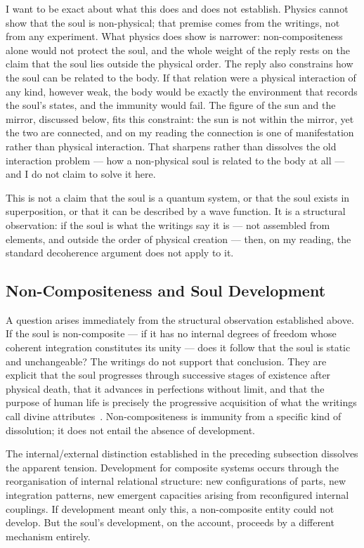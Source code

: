 I want to be exact about what this does and does not establish.
Physics cannot show that the soul is non-physical; that premise comes from the
writings, not from any experiment.
What physics does show is narrower: non-compositeness alone would not protect
the soul, and the whole weight of the reply rests on the claim that the soul
lies outside the physical order.
The reply also constrains how the soul can be related to the body.
If that relation were a physical interaction of any kind, however weak, the
body would be exactly the environment that records the soul's states, and the
immunity would fail.
The \bahai figure of the sun and the mirror, discussed below, fits this
constraint: the sun is not within the mirror, yet the two are connected, and
on my reading the connection is one of manifestation rather than physical
interaction.
That sharpens rather than dissolves the old interaction problem --- how a
non-physical soul is related to the body at all --- and I do not claim to
solve it here.

This is not a claim that the soul is a quantum system, or that the soul exists
in superposition, or that it can be described by a wave function.
It is a structural observation: if the soul is what the \bahai writings say it is
--- not assembled from elements, and outside the order of physical creation ---
then, on my reading, the standard decoherence argument does not apply to it.

\subsection{Non-Compositeness and Soul Development}

A question arises immediately from the structural observation established above.
If the soul is non-composite --- if it has no internal degrees of freedom whose
coherent integration constitutes its unity --- does it follow that the soul is
static and unchangeable?
The \bahai writings do not support that conclusion.
They are explicit that the soul progresses through successive stages of
existence after physical death, that it advances in perfections without limit,
and that the purpose of human life is precisely the progressive acquisition of
what the writings call divine attributes~\citep{GleaningsBahaullah}.
Non-compositeness is immunity from a specific kind of dissolution; it does not
entail the absence of development.

The internal/external distinction established in the preceding subsection
dissolves the apparent tension.
Development for composite systems occurs through the reorganisation of internal
relational structure: new configurations of parts, new integration patterns,
new emergent capacities arising from reconfigured internal couplings.
If development meant only this, a non-composite entity could not develop.
But the soul's development, on the \bahai account, proceeds by a different
mechanism entirely.

